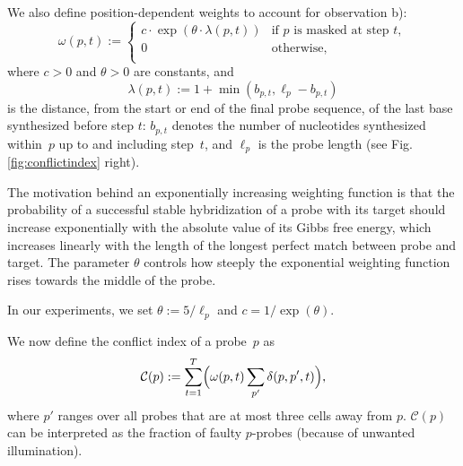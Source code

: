 \documentclass{llncs}
\newcommand{\ignore}[1]{}
\begin{document}
We also define position-dependent weights to account for observation b):
\begin{equation}\label{eq:pos_mult}
\omega(p,t) :=
\left\{
  \begin{array}{ll}
    c \cdot \exp{\left(\theta \cdot \lambda(p,t)\right)} & \mbox{if $p$ is masked at step $t$}, \\
    0 & \mbox{otherwise}, \\
  \end{array}
\right.
\end{equation}
where $c>0$ and $\theta>0$ are constants, and
\begin{equation}\label{eq:base_pos}
  \lambda(p,t) := 1 + \min(b_{p,t},\ell_{p} - b_{p,t})
\end{equation}
is the distance, from the start or end of the final probe sequence, of the
last base synthesized before step $t$: $b_{p,t}$ denotes the number of
nucleotides synthesized within~$p$ up to and including step~$t$, and
$\ell_p$ is the probe length (see Fig.\,\ref{fig:conflictindex}
right).

The motivation behind an exponentially increasing weighting function is that
the probability of a successful stable hybridization of a probe with its
target should increase exponentially with the absolute value of its Gibbs free
energy, which increases linearly with the length of the longest perfect match
between probe and target. The parameter $\theta$ controls how steeply the
exponential weighting function rises towards the middle of the probe.
%
\ignore{It is generally agreed that the chances of a successful hybridization
  between probe and target are higher if a mismatched base occurs at the
  extremities of the formed duplex instead of at its center. The precise
  effects of this position, however, is not yet fully understood and has been
  an active topic of research \cite{BINDER05}.}
%
In our experiments, we set $\theta := 5/\ell_p$ and $c = 1/\exp{(\theta)}$.


We now define the conflict index of a probe~$p$ as
\begin{equation}
\label{eq:conf_idx}
\mathcal{C}(p) := \sum_{t=1}^{T} \Bigl( \omega(p,t) \sum_{p'} \delta(p,p',t) \Bigr),
\end{equation}
where $p'$ ranges over all probes that are at most three cells away
from $p$. $\mathcal{C}(p)$ can be interpreted as the fraction of
faulty $p$-probes (because of unwanted illumination).
\end{document}
